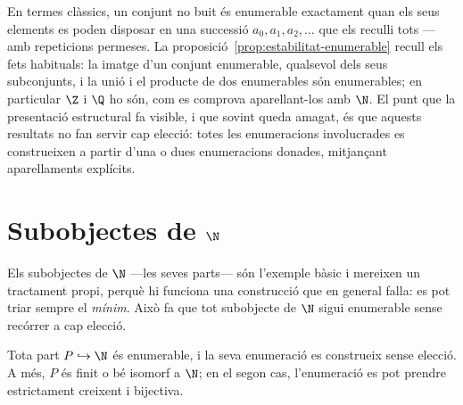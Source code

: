\begin{observacio}\label{obs:enumerable-classica}
En termes clàssics, un conjunt no buit és enumerable exactament quan els
seus elements es poden disposar en una successió
\(a_0,a_1,a_2,\dots\) que els reculli tots ---amb repeticions permeses.
La proposició~\ref{prop:estabilitat-enumerable} recull els fets habituals:
la imatge d'un conjunt enumerable, qualsevol dels seus subconjunts, i la
unió i el producte de dos enumerables són enumerables; en particular
\(\Z\) i \(\Q\) ho són, com es comprova aparellant-los amb \(\N\). El punt
que la presentació estructural fa visible, i que sovint queda amagat, és
que aquests resultats no fan servir cap elecció: totes les enumeracions
involucrades es construeixen a partir d'una o dues enumeracions donades,
mitjançant aparellaments explícits.
\end{observacio}

\section{\texorpdfstring{Subobjectes de \(\N\)}{Subobjectes de N}}\label{sec:subobjectes-N}

Els subobjectes de \(\N\) ---les seves parts--- són l'exemple bàsic i
mereixen un tractament propi, perquè hi funciona una construcció que en
general falla: es pot triar sempre el \emph{mínim}. Això fa que tot
subobjecte de \(\N\) sigui enumerable sense recórrer a cap elecció.

\begin{teorema}\label{teo:subobjectes-N}
Tota part \(P\hookrightarrow\N\) és enumerable, i la seva enumeració es
construeix sense elecció. A més, \(P\) és finit o bé isomorf a \(\N\); en
el segon cas, l'enumeració es pot prendre estrictament creixent i
bijectiva.
\end{teorema}

